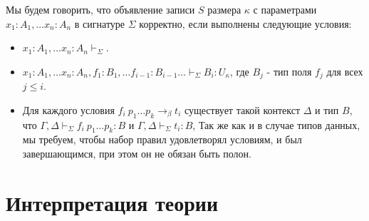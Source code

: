 \documentclass{amsart}
\theoremstyle{definition}
\theoremstyle{remark}
\numberwithin{figure}{section}
\begin{document}
Мы будем говорить, что объявление записи $S$ размера $\kappa$ с параметрами $x_1 : A_1, \ldots x_n : A_n$ в сигнатуре $\Sigma$ корректно, если выполнены следующие условия:
\begin{itemize}
\item $x_1 : A_1, \ldots x_n : A_n \vdash_\Sigma$.
\item $x_1 : A_1, \ldots x_n : A_n, f_1 : B_1, \ldots f_{i-1} : B_{i-1} \ldots \vdash_\Sigma B_i : U_\kappa$, где $B_j$ - тип поля $f_j$ для всех $j \leq i$.
\item Для каждого условия $f_i\ p_1 \ldots p_k \to_\beta t_i$ существует такой контекст $\Delta$ и тип $B$,
    что $\Gamma, \Delta \vdash_\Sigma f_i\ p_1 \ldots p_k : B$ и $\Gamma, \Delta \vdash_\Sigma t_i : B$,
    Так же как и в случае типов данных, мы требуем, чтобы набор правил удовлетворял условиям, и был завершающимся, при этом он не обязан быть полон.
\end{itemize}

\section{Интерпретация теории}
\end{document}
